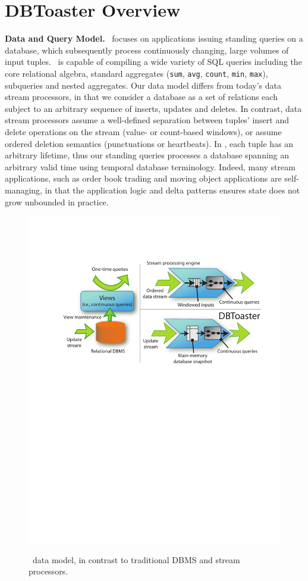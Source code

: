 \section{DBToaster Overview}

\noindent\textbf{Data and Query Model.}
\compiler\ focuses on applications issuing standing queries on a database, which
subsequently process continuously changing, large volumes of input tuples.
\compiler\ is capable of compiling a wide variety of SQL queries including the
core relational algebra, standard aggregates (\texttt{sum}, \texttt{avg},
\texttt{count}, \texttt{min}, \texttt{max}), subqueries and nested aggregates.
Our data model differs from today's data stream processors, in that we consider a
database as a set of relations each subject to an arbitrary sequence of inserts,
updates and deletes. In contrast, data stream processors assume a well-defined
separation between tuples' insert and delete operations on the stream (value- or
count-based windows), or assume ordered deletion semantics (punctuations or
heartbeats). In \compiler, each tuple has an arbitrary lifetime, thus our
standing queries processes a database spanning an arbitrary valid time using
temporal database terminology. Indeed, many stream applications, such as
order book trading and moving object applications are self-managing, in that the
application logic and delta patterns ensures state does not grow unbounded in
practice.

\begin{figure}[tb]
\includegraphics[scale=0.5]{figures/dbt-datamodel.pdf}
\label{fig:datamodel}
\caption{\compiler\ data model, in contrast to traditional DBMS and stream
processors.}
\end{figure}

